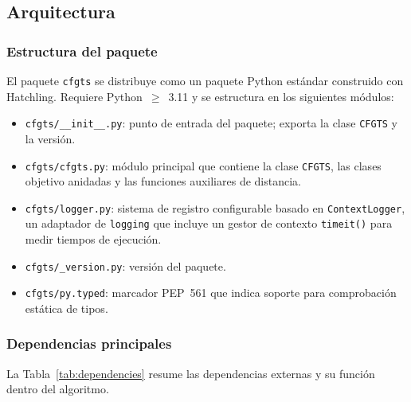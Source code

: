 \documentclass[12pt]{report} %
\begin{document}
\subsection{Arquitectura}

\subsubsection{Estructura del paquete}

El paquete \texttt{cfgts} se distribuye como un paquete Python estándar construido con Hatchling. Requiere Python~$\geq$~3.11 y se estructura en los siguientes módulos:

\begin{itemize}
    \item \texttt{cfgts/\_\_init\_\_.py}: punto de entrada del paquete; exporta la clase \texttt{CFGTS} y la versión.
    \item \texttt{cfgts/cfgts.py}: módulo principal que contiene la clase \texttt{CFGTS}, las clases objetivo anidadas y las funciones auxiliares de distancia.
    \item \texttt{cfgts/logger.py}: sistema de registro configurable basado en \texttt{ContextLogger}, un adaptador de \texttt{logging} que incluye un gestor de contexto \texttt{timeit()} para medir tiempos de ejecución.
    \item \texttt{cfgts/\_version.py}: versión del paquete.
    \item \texttt{cfgts/py.typed}: marcador PEP~561 que indica soporte para comprobación estática de tipos.
\end{itemize}

\subsubsection{Dependencias principales}

La Tabla~\ref{tab:dependencies} resume las dependencias externas y su función dentro del algoritmo.
\end{document}

